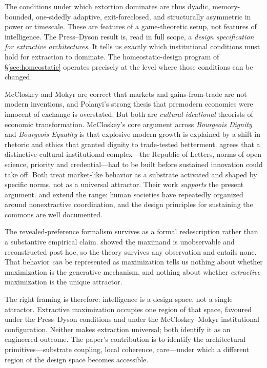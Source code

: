 \documentclass[11pt,a4paper,twocolumn]{article}
\begin{document}
The conditions under which extortion dominates are thus dyadic,
memory-bounded, one-sidedly adaptive, exit-foreclosed, and structurally
asymmetric in power or timescale. These are features of a game-theoretic
setup, not features of intelligence. The Press--Dyson result is, read in
full scope, a \emph{design specification for extractive architectures}.
It tells us exactly which institutional conditions must hold for
extraction to dominate. The homeostatic-design program of
\S\ref{sec:homeostatic} operates precisely at the level where those
conditions can be changed.

McCloskey and Mokyr are correct that markets and gains-from-trade are
not modern inventions, and Polanyi's strong thesis that premodern
economies were innocent of exchange is overstated. But both are
\emph{cultural-ideational} theorists of economic transformation.
McCloskey's core argument across \textit{Bourgeois Dignity}
\citep{mccloskey2010} and \textit{Bourgeois Equality}
\citep{mccloskey2016} is that explosive modern growth is explained by
a shift in rhetoric and ethics that granted dignity to trade-tested
betterment. \citet{mokyr2016} agrees that a distinctive
cultural-institutional complex---the Republic of Letters, norms of open
science, priority and credential---had to be built before sustained
innovation could take off. Both treat market-like behavior as a substrate
activated and shaped by specific norms, not as a universal attractor.
Their work \emph{supports} the present argument.
\citet{graeberwengrow2021} and \citet{ostrom1990} extend the range: human
societies have repeatedly organized around nonextractive coordination,
and the design principles for sustaining the commons are well
documented.

The revealed-preference formalism \citep{varian2005} survives as a
formal redescription rather than a substantive empirical claim.
\citet{sen1977} showed the maximand is unobservable and reconstructed
post hoc, so the theory survives any observation and entails none. That
behavior \emph{can} be represented as maximization tells us nothing
about whether maximization is the generative mechanism, and nothing
about whether \emph{extractive} maximization is the unique attractor.

The right framing is therefore: intelligence is a design space, not a
single attractor. Extractive maximization occupies one region of that
space, favoured under the Press--Dyson conditions and under the
McCloskey--Mokyr institutional configuration. Neither makes extraction
universal; both identify it as an engineered outcome. The paper's
contribution is to identify the architectural primitives---substrate
coupling, local coherence, care---under which a different region of the
design space becomes accessible.
\end{document}
